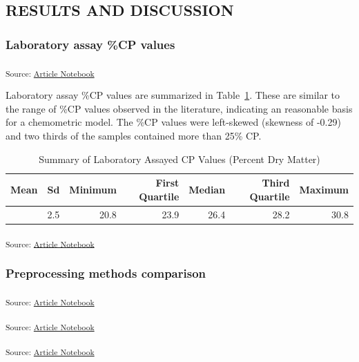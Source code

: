 \documentclass[
]{agujournal2019}
\begin{document}
\subsection{RESULTS AND DISCUSSION}\label{results-and-discussion}

\subsubsection{Laboratory assay \%CP
values}\label{laboratory-assay-cp-values}

\textsubscript{Source:
\href{https://rvcrawford.github.io/glowing-system/index.qmd.html}{Article
Notebook}}

Laboratory assay \%CP values are summarized in
Table~\ref{tbl-lab-protein-vals}. These are similar to the range of \%CP
values observed in the literature, indicating an reasonable basis for a
chemometric model. The \%CP values were left-skewed (skewness of -0.29)
and two thirds of the samples contained more than 25\% CP.

\begin{longtable}[]{@{}rrrrrrr@{}}

\caption{\label{tbl-lab-protein-vals}Summary of Laboratory Assayed CP
Values (Percent Dry Matter)}

\tabularnewline

\toprule\noalign{}
Mean & Sd & Minimum & First Quartile & Median & Third Quartile &
Maximum \\
\midrule\noalign{}
\endhead
\bottomrule\noalign{}
\endlastfoot
26.1 & 2.5 & 20.8 & 23.9 & 26.4 & 28.2 & 30.8 \\

\end{longtable}

\textsubscript{Source:
\href{https://rvcrawford.github.io/glowing-system/index.qmd.html}{Article
Notebook}}

\subsubsection{Preprocessing methods
comparison}\label{preprocessing-methods-comparison}

\textsubscript{Source:
\href{https://rvcrawford.github.io/glowing-system/index.qmd.html}{Article
Notebook}}

\textsubscript{Source:
\href{https://rvcrawford.github.io/glowing-system/index.qmd.html}{Article
Notebook}}

\textsubscript{Source:
\href{https://rvcrawford.github.io/glowing-system/index.qmd.html}{Article
Notebook}}
\end{document}
